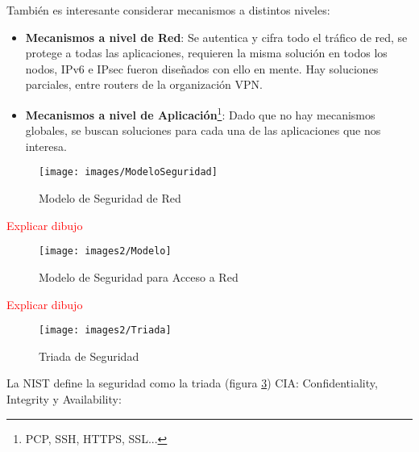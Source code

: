 \documentclass[10pt,portrait, twocolumn]{article}
\begin{document}
También es interesante considerar mecanismos a distintos niveles:

	\begin{itemize}
		\item \textbf{Mecanismos a nivel de Red}: Se autentica y cifra todo el tráfico de red, se protege a todas las aplicaciones, requieren la misma solución en todos los nodos, IPv6 e IPsec fueron diseñados con ello en mente. Hay soluciones parciales, entre routers de la organización VPN.
		\item \textbf{Mecanismos a nivel de Aplicación}\footnote{PCP, SSH, HTTPS, SSL...}: Dado que no hay mecanismos globales, se buscan soluciones para cada una de las aplicaciones que nos interesa.
	\end{itemize}
	
	\begin{figure}[ht!]
	\centering
	\texttt{[image: images/ModeloSeguridad]}
	\caption{Modelo de Seguridad de Red}
	\label{table:Planta1}
	\end{figure}
	
\textcolor{red}{Explicar dibujo}

	\begin{figure}[ht!]
	\centering
	\texttt{[image: images2/Modelo]}
	\caption{Modelo de Seguridad para Acceso a Red}
	\label{table:Planta1}
	\end{figure}
	
\textcolor{red}{Explicar dibujo}

	\begin{figure}[ht!]
	\centering
	\texttt{[image: images2/Triada]}
	\caption{Triada de Seguridad}
	\label{fig:Triada}
	\end{figure}
	
La NIST define la seguridad como la triada (figura \ref{fig:Triada}) CIA: Confidentiality, Integrity y Availability:
\end{document}
